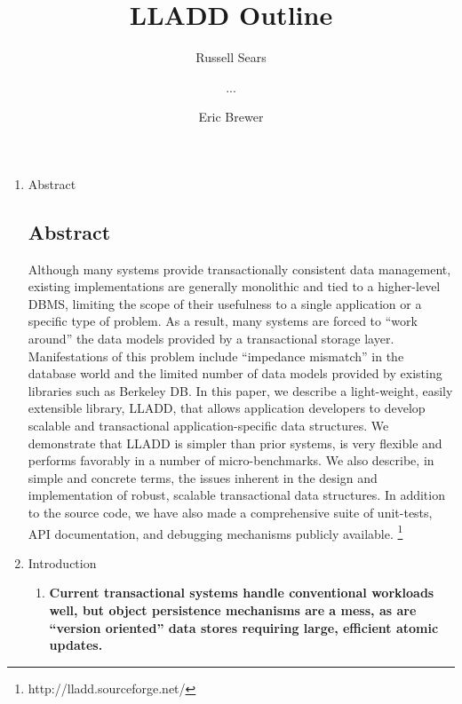 \documentclass[letterpaper,english]{article}
\begin{document}
\title{LLADD Outline }


\author{Russell Sears \and ... \and Eric Brewer}

\maketitle



\begin{enumerate}

\item Abstract

\subsection*{Abstract}


Although many systems provide transactionally consistent data
management, existing implementations are generally monolithic and tied
to a higher-level DBMS, limiting the scope of their usefulness to a
single application or a specific type of problem. As a result, many
systems are forced to ``work around'' the data models provided by a
transactional storage layer. Manifestations of this problem include
``impedance mismatch'' in the database world and the limited number of
data models provided by existing libraries such as Berkeley DB. In
this paper, we describe a light-weight, easily extensible library,
LLADD, that allows application developers to develop scalable and
transactional application-specific data structures. We demonstrate
that LLADD is simpler than prior systems, is very flexible and
performs favorably in a number of micro-benchmarks. We also describe,
in simple and concrete terms, the issues inherent in the design and
implementation of robust, scalable transactional data structures. In
addition to the source code, we have also made a comprehensive suite
of unit-tests, API documentation, and debugging mechanisms publicly
available.%
\footnote{http://lladd.sourceforge.net/%
}

\item Introduction 

\begin{enumerate}


  \item {\bf Current transactional systems handle conventional workloads
  well, but object persistence mechanisms are a mess, as are
  {}``version oriented'' data stores requiring large, efficient atomic
  updates.}


\end{enumerate}
\end{enumerate}
\end{document}
